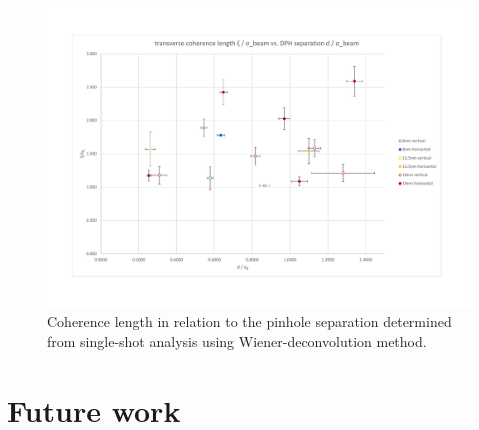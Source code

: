 \documentclass{osa-article}
\begin{document}
\begin{figure}[hbtp]
    \centering
    \includegraphics[width=1\textwidth]{gfx/xi_over_sigma_wiener_singelshot.pdf}
    \caption{Coherence length in relation to the pinhole separation determined from single-shot analysis using Wiener-deconvolution method.}
    \label{fig:DPH_results_coherence_vs_separation}
\end{figure}

\section{Future work}





\end{document}
